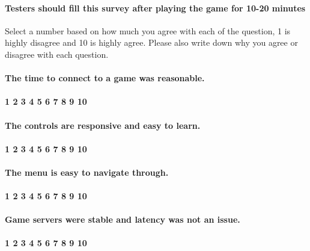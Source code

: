 \documentclass[12pt, titlepage]{article}
\begin{document}
\paragraph{Testers should fill this survey after playing the game for 10-20 minutes}
Select a number based on how much you agree with each of the question, 1 is highly disagree and 10 is highly agree. Please also write down why you agree or disagree with each question.

\paragraph{The time to connect to a game was reasonable.}
\paragraph{1 2 3 4 5 6 7 8 9 10}
\paragraph{The controls are responsive and easy to learn.}
\paragraph{1 2 3 4 5 6 7 8 9 10}
\paragraph{The menu is easy to navigate through.}
\paragraph{1 2 3 4 5 6 7 8 9 10}
\paragraph{Game servers were stable and latency was not an issue.}
\paragraph{1 2 3 4 5 6 7 8 9 10}
\end{document}
